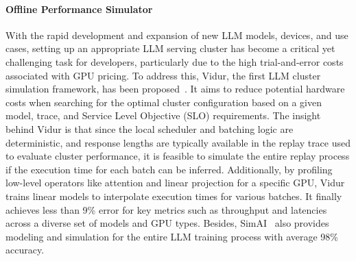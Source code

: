\documentclass[sigconf, review, anonymous]{acmart}
\begin{document}


\paragraph{Offline Performance Simulator} \label{section:performance simulation}

With the rapid development and expansion of new LLM models, devices, and use cases, setting up an appropriate LLM serving cluster has become a critical yet challenging task for developers, particularly due to the high trial-and-error costs associated with GPU pricing. To address this, Vidur, the first LLM cluster simulation framework, has been proposed~\cite{vidur}. It aims to reduce potential hardware costs when searching for the optimal cluster configuration based on a given model, trace, and Service Level Objective (SLO) requirements. The insight behind Vidur is that since the local scheduler and batching logic are deterministic, and response lengths are typically available in the replay trace used to evaluate cluster performance, it is feasible to simulate the entire replay process if the execution time for each batch can be inferred. Additionally, by profiling low-level operators like attention and linear projection for a specific GPU, Vidur trains linear models to interpolate execution times for various batches. It finally achieves less than 9\% error for key metrics such as throughput and latencies across a diverse set of models and GPU types. Besides, SimAI~\cite{simAI} also provides modeling and simulation for the entire LLM training process with average 98\% accuracy.
\end{document}
